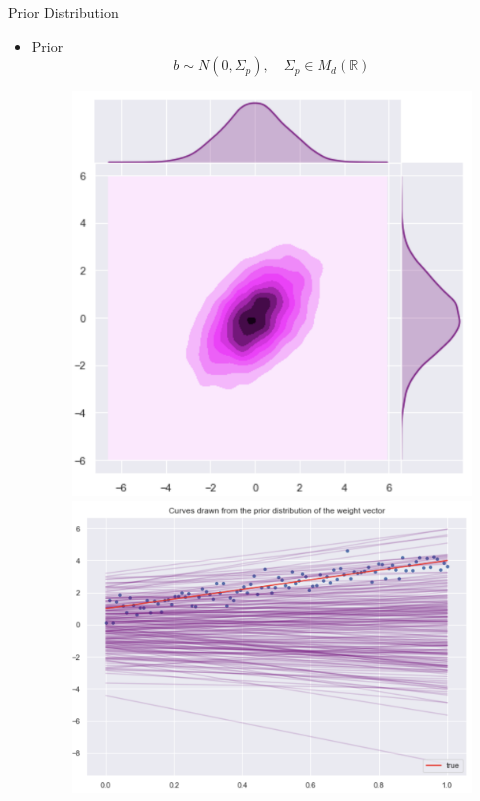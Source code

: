 \documentclass[10pt]{beamer}
\begin{document}
\begin{frame}{Prior Distribution}
\begin{itemize}
\item Prior 
$$
b \sim N(0, \Sigma_p), \quad  \Sigma_p \in M_{d}(\mathbb{R})
$$

\begin{center}
\begin{figure}
\includegraphics[scale=0.17]{images/lin_join_prior.png} 
\includegraphics[scale=0.17]{images/prior_lin_mod_param_distr.png} 

\end{figure}
\end{center}
\end{itemize}
\end{frame}
\end{document}
